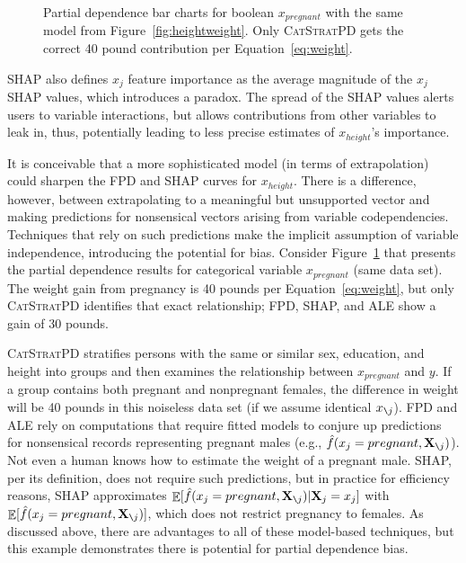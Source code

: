 \documentclass[smallextended]{svjour3}       %
\renewcommand{\eqref}[1]{Equation~\ref{#1}}
\newcommand{\figref}[1]{Figure~\ref{#1}}
\newcommand{\cspd}{\fontfamily{cmr}\textsc{\small CatStratPD}}
\newcommand{\xnj}{$x_{\texttt{\char`\\} j}$}
\renewcommand{\slash}{\texttt{\char`\\}}
\DeclareMathOperator{\Ex}{\mathbb{E}}
\begin{document}
\begin{figure}[!htbp]
\begin{center}
\caption{\small  Partial dependence bar charts for boolean $x_{pregnant}$ with the same model from \figref{fig:heightweight}. Only \cspd{} gets the correct 40 pound contribution per \eqref{eq:weight}.}
\label{fig:pregnant}
\end{center}
\end{figure}


SHAP also defines $x_j$ feature importance as the average magnitude of the $x_j$ SHAP values, which introduces a paradox.  The spread of the SHAP values alerts users to variable interactions, but allows contributions from other variables to leak in, thus, potentially leading to less precise estimates of $x_{height}$'s importance.

It is conceivable that a more sophisticated model (in terms of extrapolation) could sharpen the FPD and SHAP curves for $x_{height}$. There is a difference, however, between extrapolating to a meaningful but unsupported vector and making predictions for nonsensical vectors arising from variable codependencies.  Techniques that rely on such predictions make the implicit assumption of variable independence, introducing the potential for bias. Consider \figref{fig:pregnant} that presents the partial dependence results for categorical variable $x_{pregnant}$ (same data set). The weight gain from pregnancy is 40 pounds per \eqref{eq:weight}, but only \cspd{} identifies that exact relationship; FPD, SHAP, and ALE show a gain of 30 pounds. 

\cspd{} stratifies persons with the same or similar sex, education, and height into groups and then examines the relationship between $x_{pregnant}$ and $y$. If a group contains both pregnant and nonpregnant females, the difference in weight will be 40 pounds in this noiseless data set (if we assume identical \xnj).  FPD and ALE rely on computations that require fitted models to conjure up predictions for nonsensical records representing pregnant males (e.g., $\hat{f}(x_j = pregnant, {\bf X}_{\slash j})$). Not even a human knows how to estimate the weight of a pregnant male. SHAP, per its definition, does not require such predictions, but in practice for efficiency reasons, SHAP approximates $\Ex[\hat{f}(x_{j} = pregnant,{\bf X}_{\slash j}) | {\bf X}_j = x_j]$ with $\Ex[\hat{f}(x_{j} = pregnant,{\bf X}_{\slash j})]$, which does not restrict pregnancy to females. As discussed above, there are advantages to all of these model-based techniques, but this example demonstrates there is potential for partial dependence bias.
\end{document}

